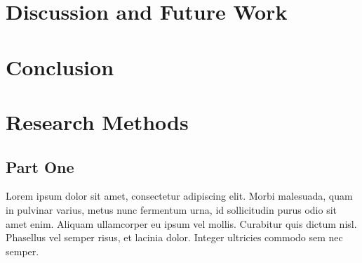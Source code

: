 \documentclass[sigconf]{acmart}
\begin{document}
\section{Discussion and Future Work}

\section{Conclusion}

\begin{acks}

\end{acks}




\appendix

\section{Research Methods}

\subsection{Part One}

Lorem ipsum dolor sit amet, consectetur adipiscing elit. Morbi
malesuada, quam in pulvinar varius, metus nunc fermentum urna, id
sollicitudin purus odio sit amet enim. Aliquam ullamcorper eu ipsum
vel mollis. Curabitur quis dictum nisl. Phasellus vel semper risus, et
lacinia dolor. Integer ultricies commodo sem nec semper.
\end{document}
